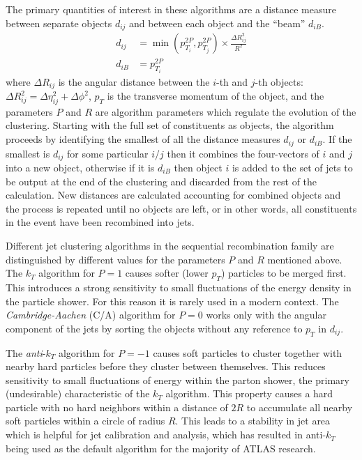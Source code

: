 The primary quantities of interest in these algorithms are a distance measure between separate objects $d_{ij}$ and between each object and the ``beam'' $d_{iB}$.
\begin{align}
d_{ij} &= \min\left({p_{T_i}^{2P}, p_{T_j}^{2P}}\right) \times \frac{\Delta R_{ij}^2}{R^2} \\
d_{iB} &= p_{T_i}^{2P}
\end{align}
where $\Delta R_{ij}$ is the angular distance between the $i$-th and $j$-th objects: $\Delta R_{ij}^2 = \Delta \eta_{ij}^2 + \Delta \phi^2$, $p_T$ is the transverse momentum of the object, and the parameters $P$ and $R$ are algorithm parameters which regulate the evolution of the clustering.
Starting with the full set of constituents as objects, the algorithm proceeds by identifying the smallest of all the distance measures $d_{ij}$ or $d_{iB}$.
If the smallest is $d_{ij}$ for some particular $i$/$j$ then it combines the four-vectors of $i$ and $j$ into a new object, otherwise if it is $d_{iB}$ then object $i$ is added to the set of jets to be output at the end of the clustering and discarded from the rest of the calculation.
New distances are calculated accounting for combined objects and the process is repeated until no objects are left, or in other words, all constituents in the event have been recombined into jets.

Different jet clustering algorithms in the sequential recombination family are distinguished by different values for the parameters $P$ and $R$ mentioned above. 
The $k_T$ algorithm \cite{Catani:1993hr} for $P=1$ causes softer (lower $p_T$) particles to be merged first.
This introduces a strong sensitivity to small fluctuations of the energy density in the particle shower.
For this reason it is rarely used in a modern context.
The \textit{Cambridge-Aachen} (C/A) algorithm \cite{Dokshitzer:1997in} for $P=0$ works only with the angular component of the jets by sorting the objects without any reference to $p_T$ in $d_{ij}$.

The \textit{anti}-$k_T$ algorithm \cite{Cacciari:2008gp} for $P = -1$ causes soft particles to cluster together with nearby hard particles before they cluster between themselves. 
This reduces sensitivity to small fluctuations of energy within the parton shower, the primary (undesirable) characteristic of the $k_T$ algorithm.
This property causes a hard particle with no hard neighbors within a distance of $2R$ to accumulate all nearby soft particles within a circle of radius $R$.
This leads to a stability in jet area which is helpful for jet calibration and analysis, which has resulted in anti-$k_T$ being used as the default algorithm for the majority of ATLAS research.

